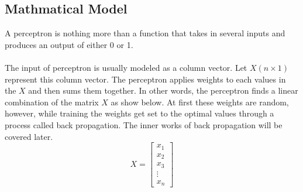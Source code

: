 
\subsection{Mathmatical Model}	
		
A perceptron is nothing more than a function that takes in several inputs and produces an output of either 0 or 1.\\ \\
The input of perceptron is usually modeled as a column vector. Let $X(n\times1)$ represent this column vector. The perceptron applies weights to each values in the $X$ and then sums them together. In other words, the perceptron finds a linear combination of the matrix $X$ as show below. At first these weights are random, however, while training the weights get set to the optimal values through a process called back propagation. The inner works of back propagation will be covered later.
$$
X = 
\begin{bmatrix}
	x_1 \\
	x_2 \\
	x_3 \\
	\vdots \\
	x_n
\end{bmatrix} 
$$
